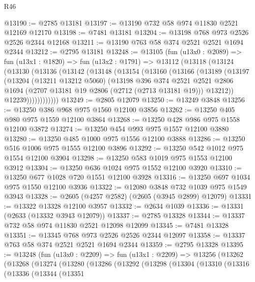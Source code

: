 \begin{lexlean}{R46}
\begin{coremodule}
@13190 := @2785 @13181
@13197 := @13190 @732 @58 @974 @11830 @2521 @12169 @12170
@13198 := @7481 @13181
@13204 := @13198 @768 @973 @2526 @2526 @2344 @12168
@13211 := @13190 @763 @58 @374 @2521 @2521 @1694 @2344
@13212 := @2795 @13181
@13248 := @13105
    (fun (u13x0 : @2089) =>
    fun (u13x1 : @1820) =>
    fun (u13x2 : @1791) =>
    @13112
      (@13118
        (@13124
          (@13130
            (@13136
              (@13142
                (@13148
                  (@13154
                    (@13160
                      (@13166
                        (@13189
                          (@13197
                            (@13204
                              (@13211 @13212 @5060)
                              (@13198
                                @396
                                @374
                                @2521
                                @2521
                                @2806
                                @1694
                                (@2707 @13181 @19 @2806 (@2712 (@2713 @13181 @19)))
                                @13212))
                            @12239))))))))))))
@13249 := @2805 @12079
@13250 := @13249 @3848
@13256 := @13250 @386 @968 @975 @1560 @12100 @3856
@13262 := @13250 @405 @980 @975 @1559 @12100 @3864
@13268 := @13250 @428 @986 @975 @1558 @12100 @3872
@13274 := @13250 @454 @993 @975 @1557 @12100 @3880
@13280 := @13250 @485 @1000 @975 @1556 @12100 @3888
@13286 := @13250 @516 @1006 @975 @1555 @12100 @3896
@13292 := @13250 @542 @1012 @975 @1554 @12100 @3904
@13298 := @13250 @583 @1019 @975 @1553 @12100 @3912
@13304 := @13250 @636 @1024 @975 @1552 @12100 @3920
@13310 := @13250 @677 @1028 @720 @1551 @12100 @3928
@13316 := @13250 @697 @1034 @975 @1550 @12100 @3936
@13322 := @12080 @3848 @732 @1039 @975 @1549 @3943
@13328 := @2605 (@4257 @2582) (@2605 (@3945 @2899) @12079)
@13331 := @13322 @13328 @12100 @3957
@13332 := @2634 @1039
@13336 := @13331 (@2633 (@13332 @3943 @12079))
@13337 := @2785 @13328
@13344 := @13337 @732 @58 @974 @11830 @2521 @12098 @12099
@13345 := @7481 @13328
@13351 := @13345 @768 @973 @2526 @2526 @2344 @12097
@13358 := @13337 @763 @58 @374 @2521 @2521 @1694 @2344
@13359 := @2795 @13328
@13395 := @13248
    (fun (u13x0 : @2209) =>
    fun (u13x1 : @2209) =>
    @13256
      (@13262
        (@13268
          (@13274
            (@13280
              (@13286
                (@13292
                  (@13298
                    (@13304
                      (@13310
                        (@13316
                          (@13336
                            (@13344
                              (@13351

\end{coremodule}
\end{lexlean}
